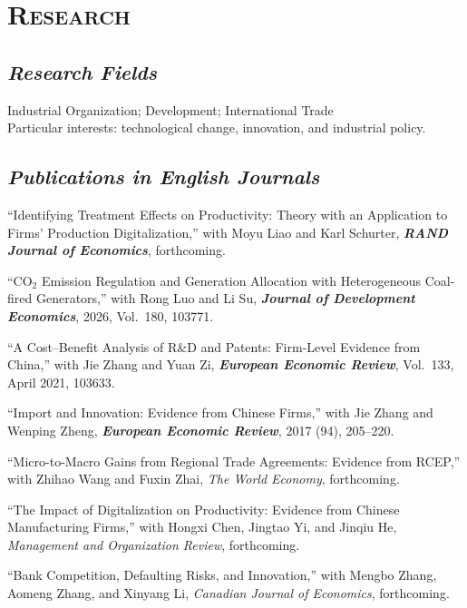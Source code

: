 \documentclass[letterpaper]{article}
\begin{document}
\section*{\textsc{Research}}
\subsection*{\textit{Research Fields}}
 Industrial Organization; Development; International Trade \\
 Particular interests: technological change, innovation, and industrial policy.

\subsection*{\textit{Publications in English Journals}}
\begin{papers}
\item ``Identifying Treatment Effects on Productivity: Theory with an Application to Firms' Production Digitalization,'' with Moyu Liao and Karl Schurter, \textbf{\textit{RAND Journal of Economics}}, forthcoming.

\item ``CO$_{2}$ Emission Regulation and Generation Allocation with Heterogeneous Coal-fired Generators,'' with Rong Luo and Li Su, \textbf{\textit{Journal of Development Economics}}, 2026, Vol.\ 180, 103771.

\item ``A Cost--Benefit Analysis of R\&D and Patents: Firm-Level Evidence from China,'' with Jie Zhang and Yuan Zi, \textbf{\textit{European Economic Review}}, Vol.\ 133, April 2021, 103633.

\item ``Import and Innovation: Evidence from Chinese Firms,'' with Jie Zhang and Wenping Zheng, \textbf{\textit{European Economic Review}}, 2017 (94), 205--220.

\item ``Micro-to-Macro Gains from Regional Trade Agreements: Evidence from RCEP,'' with Zhihao Wang and Fuxin Zhai, \textit{The World Economy}, forthcoming.

\item ``The Impact of Digitalization on Productivity: Evidence from Chinese Manufacturing Firms,'' with Hongxi Chen, Jingtao Yi, and Jinqiu He, \textit{Management and Organization Review}, forthcoming.

\item ``Bank Competition, Defaulting Risks, and Innovation,'' with Mengbo Zhang, Aomeng Zhang, and Xinyang Li, \textit{Canadian Journal of Economics}, forthcoming.


\end{papers}
\end{document}

